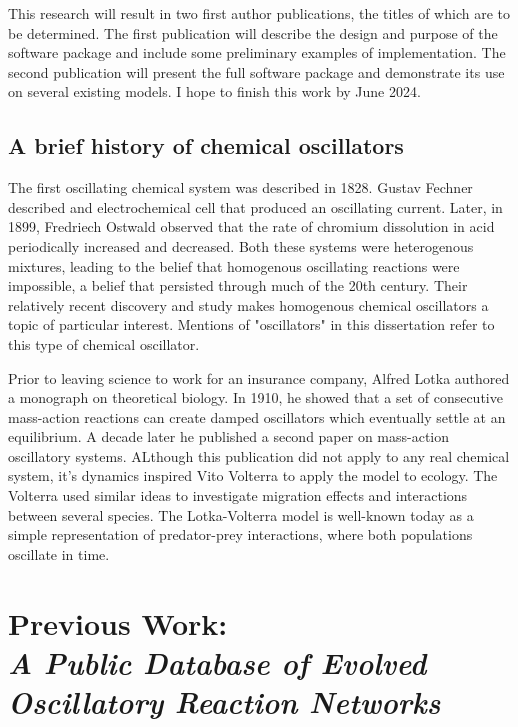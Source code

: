 \documentclass[12pt]{report}
\begin{document}
This research will result in two first author publications, the titles of which are to be determined. The first publication will describe the design and purpose of the software package and include some preliminary examples of implementation. The second publication will present the full software package and demonstrate its use on several existing models. I hope to finish this work by June 2024.

\section{A brief history of chemical oscillators}
The first oscillating chemical system was described in 1828. Gustav Fechner described and electrochemical cell that produced an oscillating current. Later, in 1899, Fredriech Ostwald observed that the rate of chromium dissolution in acid periodically increased and decreased. Both these systems were heterogenous mixtures, leading to the belief that homogenous oscillating reactions were impossible, a belief that persisted through much of the 20th century. Their relatively recent discovery and study makes homogenous chemical oscillators a topic of particular interest. Mentions of "oscillators" in this dissertation refer to this type of chemical oscillator.

Prior to leaving science to work for an insurance company, Alfred Lotka authored a monograph on theoretical biology. In 1910, he showed that a set of consecutive mass-action reactions can create damped oscillators which eventually settle at an equilibrium. A decade later he published a second paper on mass-action oscillatory systems. ALthough this publication did not apply to any real chemical system, it's dynamics inspired Vito Volterra to apply the model to ecology. The Volterra used similar ideas to investigate migration effects and interactions between several species. The Lotka-Volterra model is well-known today as a simple representation of predator-prey interactions, where both populations oscillate in time.

\chapter{Previous Work: \\ \textit{A Public Database of Evolved Oscillatory Reaction Networks}}
\end{document}
